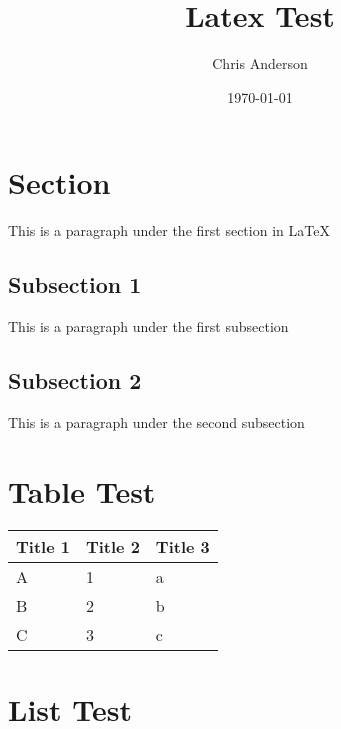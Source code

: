 \documentclass{article}
\title{Latex Test}
\author{Chris Anderson}
\date{\today}
\begin{document}
\maketitle

\section{Section}

This is a paragraph under the first section in \LaTeX

\subsection{Subsection 1}
This is a paragraph under the first subsection

\subsection{Subsection 2}
This is a paragraph under the second subsection

\section{Table Test}

\begin{table}[h]
    \centering
    \begin{tabular}{|l|l|l|}
    \hline
        Title 1 & Title 2 & Title 3 \\ \hline
        A       & 1       & a       \\ \hline
        B       & 2       & b       \\ \hline
        C       & 3       & c       \\ \hline
    \end{tabular}
\end{table}

\section{List Test}
\end{document}

